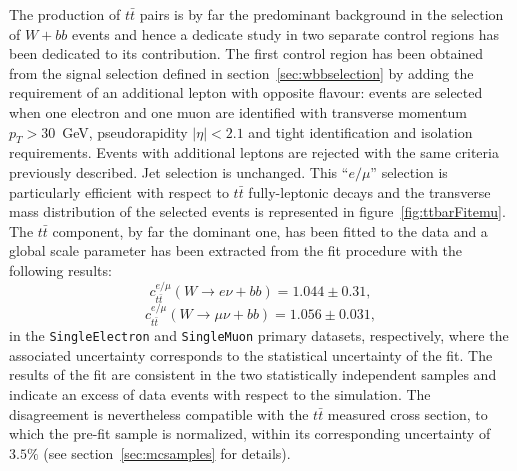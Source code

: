 The production of $t\bar{t}$ pairs is by far the predominant background 
in the selection of $W + bb$ events and hence a dedicate study in two separate 
control regions has been dedicated to its contribution.
The first control region has been obtained from the signal selection 
defined in section~\ref{sec:wbbselection} by adding the requirement of an 
additional lepton with opposite flavour:
events are selected when one electron and one muon are identified with 
transverse momentum $p_{T}>30$~GeV, pseudorapidity $|\eta|<2.1$ and tight identification 
and isolation requirements.
Events with additional leptons are rejected with the same criteria previously described.
Jet selection is unchanged.
This ``$e/\mu$'' selection is particularly efficient with respect to $t\bar{t}$ 
fully-leptonic decays and the transverse mass distribution 
of the selected events is represented in figure~\ref{fig:ttbarFitemu}.
The $t\bar{t}$ component, by far the dominant one, has been fitted to the data and a global scale 
parameter has been extracted from the fit procedure with the following results:
$$c_{t\bar{t}}^{e/\mu}(W \rightarrow e \nu + bb) = 1.044 \pm 0.31 \mathrm{,}$$
$$c_{t\bar{t}}^{e/\mu}(W \rightarrow \mu \nu + bb) = 1.056 \pm 0.031 \mathrm{,}$$
in the \texttt{SingleElectron} and \texttt{SingleMuon} primary datasets, 
respectively, where the associated uncertainty corresponds to 
the statistical uncertainty of the fit.
The results of the fit are consistent in the two statistically independent 
samples and indicate an excess of data events with respect to the simulation. 
The disagreement is nevertheless compatible with the 
$t\bar{t}$ measured cross section,
to which the pre-fit sample is normalized, within its corresponding uncertainty 
of $3.5\%$ (see section~\ref{sec:mcsamples} for details).

